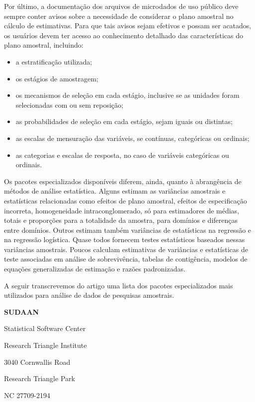 \documentclass[]{book}
\theoremstyle{definition}
\theoremstyle{definition}
\theoremstyle{definition}
\theoremstyle{remark}
\begin{document}
Por último, a documentação dos arquivos de microdados de uso público
deve sempre conter avisos sobre a necessidade de considerar o plano
amostral no cálculo de estimativas. Para que tais avisos sejam efetivos
e possam ser acatados, os usuários devem ter acesso ao conhecimento
detalhado das características do plano amostral, incluindo:

\begin{itemize}
\item
  a estratificação utilizada;
\item
  os estágios de amostragem;
\item
  os mecanismos de seleção em cada estágio, inclusive se as unidades
  foram selecionadas com ou sem reposição;
\item
  as probabilidades de seleção em cada estágio, sejam iguais ou
  distintas;
\item
  as escalas de mensuração das variáveis, se contínuas, categóricas ou
  ordinais;
\item
  as categorias e escalas de resposta, no caso de variáveis categóricas
  ou ordinais.
\end{itemize}

Os pacotes especializados disponíveis diferem, ainda, quanto à
abrangência de métodos de análise estatística. Alguns estimam as
variâncias amostrais e estatísticas relacionadas como efeitos de plano
amostral, efeitos de especificação incorreta, homogeneidade
intraconglomerado, só para estimadores de médias, totais e proporções
para a totalidade da amostra, para domínios e diferenças entre domínios.
Outros estimam também variâncias de estatísticas na regressão e na
regressão logística. Quase todos fornecem testes estatísticos baseados
nessas variâncias amostrais. Poucos calculam estimativas de variâncias e
estatísticas de teste associadas em análise de sobrevivência, tabelas de
contigência, modelos de equações generalizadas de estimação e razões
padronizadas.

A seguir transcrevemos do artigo \citep{Lepkowski} uma lista dos pacotes
especializados mais utilizados para análise de dados de pesquisas
amostrais.

\textbf{SUDAAN}

Statistical Software Center

Research Triangle Institute

3040 Cornwallis Road

Research Triangle Park

NC 27709-2194
\end{document}
